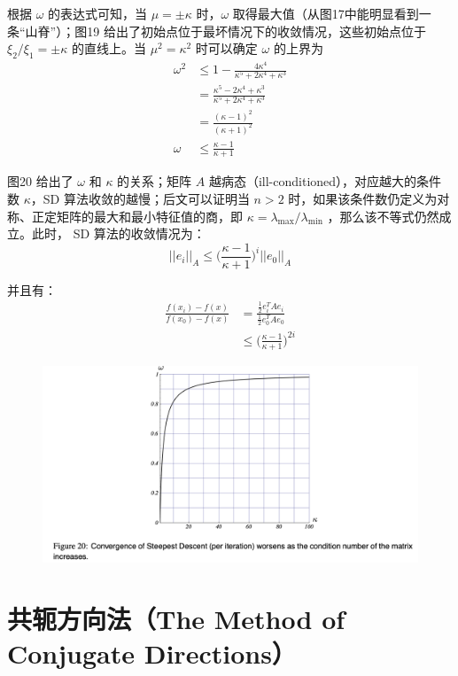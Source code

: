 \documentclass[12pt]{article}
\begin{document}
根据 $\omega$ 的表达式可知，当 $\mu = \pm \kappa$ 时，$\omega$ 取得最大值（从图17中能明显看到一条“山脊”）；图19 给出了初始点位于最坏情况下的收敛情况，这些初始点位于 $\xi_2/\xi_1 = \pm \kappa$ 的直线上。当 $\mu^2 = \kappa^2$ 时可以确定 $\omega$ 的上界为
\begin{align*}
\omega^2 &\le 1 - \frac{4\kappa^4}{\kappa^5 + 2\kappa^4 + \kappa^3} \\
	&= \frac{\kappa^5 - 2\kappa^4 + \kappa^3}{\kappa^5 + 2\kappa^4 + \kappa^3}  \\
	&= \frac{(\kappa - 1)^2}{(\kappa + 1)^2} \\
\omega &\le \frac{\kappa - 1}{\kappa + 1}
\end{align*}

图20 给出了 $\omega$ 和 $\kappa$ 的关系；矩阵 $A$ 越病态（ill-conditioned），对应越大的条件数 $\kappa$，SD 算法收敛的越慢；后文可以证明当 $n > 2$ 时，如果该条件数仍定义为对称、正定矩阵的最大和最小特征值的商，即 $\kappa = \lambda_{\max}/ \lambda_{\min}$ ，那么该不等式仍然成立。此时， SD 算法的收敛情况为：
$$
||e_i||_A \le \Big(\frac{\kappa - 1}{\kappa + 1}\Big)^i ||e_0||_A
$$

并且有：
\begin{align*}
\frac{f(x_i) - f(x)}{f(x_0)-f(x)} &= \frac{\frac{1}{2}e^T_iAe_i}{\frac{1}{2}e^T_0Ae_0} \\
&\le \Big(\frac{\kappa - 1}{\kappa + 1}\Big)^{2i}
\end{align*}

\begin{figure}[H]
    \centering
    \includegraphics[width=1\textwidth]{fig/CG_Convergence_SD_5.png}
\end{figure}

\section{共轭方向法（The Method of Conjugate Directions）}
\end{document}
